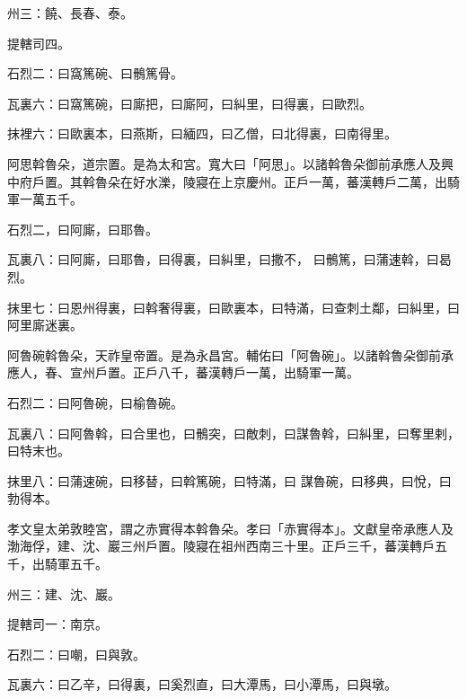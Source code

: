 \begin{pinyinscope}
 州三：饒、長春、泰。



 提轄司四。



 石烈二：曰窩篤碗、曰鶻篤骨。



 瓦裏六：曰窩篤碗，曰廝把，曰廝阿，曰糾里，曰得裏，曰歐烈。



 抹裡六：曰歐裏本，曰燕斯，曰緬四，曰乙僧，曰北得裏，曰南得里。



 阿思斡魯朵，道宗置。是為太和宮。寬大曰「阿思」。以諸斡魯朵御前承應人及興中府戶置。其斡魯朵在好水濼，陵寢在上京慶州。正戶一萬，蕃漢轉戶二萬，出騎軍一萬五千。



 石烈二，曰阿廝，曰耶魯。



 瓦裏八：曰阿廝，曰耶魯，曰得裏，曰糾里，曰撒不，
 曰鶻篤，曰蒲速斡，曰曷烈。



 抹里七：曰恩州得裏，曰斡奢得裏，曰歐裏本，曰特滿，曰查刺土鄰，曰糾里，曰阿里廝迷裏。



 阿魯碗斡魯朵，天祚皇帝置。是為永昌宮。輔佑曰「阿魯碗」。以諸斡魯朵御前承應人，春、宣州戶置。正戶八千，蕃漢轉戶一萬，出騎軍一萬。



 石烈二：曰阿魯碗，曰榆魯碗。



 瓦裏八：曰阿魯斡，曰合里也，曰鶻突，曰敵刺，曰謀魯斡，曰糾里，曰奪里剌，曰特末也。



 抹里八：曰蒲速碗，曰移替，曰斡篤碗，曰特滿，曰
 謀魯碗，曰移典，曰悅，曰勃得本。



 孝文皇太弟敦睦宮，謂之赤實得本斡魯朵。孝曰「赤實得本」。文獻皇帝承應人及渤海俘，建、沈、巖三州戶置。陵寢在祖州西南三十里。正戶三千，蕃漢轉戶五千，出騎軍五千。



 州三：建、沈、巖。



 提轄司一：南京。



 石烈二：曰嘲，曰與敦。



 瓦裏六：曰乙辛，曰得裏，曰奚烈直，曰大潭馬，曰小潭馬，曰與墩。




\end{pinyinscope}
